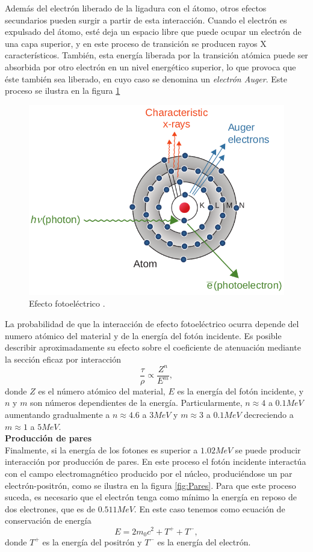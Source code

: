 Además del electrón liberado de la ligadura con el átomo, otros efectos secundarios pueden surgir a partir de esta interacción. Cuando el electrón es expulsado del átomo, esté deja un espacio libre que puede ocupar un electrón de una capa superior, y en este proceso de transición se producen rayos X característicos. También, esta energía liberada por la transición atómica puede ser absorbida por otro electrón en un nivel energético superior, lo que provoca que éste también sea liberado, en cuyo caso se denomina un \textit{electrón Auger}. Este proceso se ilustra en la figura \ref{fig:fotoelectrico}\\
\begin{figure}[H]
	\centering
	\includegraphics[width=0.7\linewidth]{images/fotoelectrico.png}
	\caption{Efecto fotoeléctrico \cite{khan2014the}.}
	\label{fig:fotoelectrico}
\end{figure}

La probabilidad de que la interacción de efecto fotoeléctrico ocurra depende del numero atómico del material y de la energía del fotón incidente. Es posible describir aproximadamente su efecto sobre el coeficiente de atenuación mediante la sección eficaz por interacción
\begin{equation}
	\frac{\tau}{\rho}\propto \frac{Z^n}{E^m},
\end{equation} 
donde $Z$ es el número atómico del material, $E$ es la energía del fotón incidente, y $n$ y $m$ son números dependientes de la energía. Particularmente, $n\approx 4$ a $0.1 MeV$ aumentando gradualmente a $n\approx4.6$ a $3 MeV$ y $m\approx3$ a $0.1 MeV$ decreciendo a $m\approx1$ a $5 MeV$\cite{Attix1986}.\\

\textbf{Producción de pares}\\

Finalmente, si la energía de los fotones es superior a $1.02 MeV$ se puede producir interacción por producción de pares. En este proceso el fotón incidente interactúa con el campo electromagnético producido por el núcleo, produciéndose un par electrón-positrón, como se ilustra en la figura \ref{fig:Pares}. Para que este proceso suceda, es necesario que el electrón tenga como mínimo la energía en reposo de dos electrones, que es de $0.511 MeV$. En este caso tenemos como ecuación de conservación de energía
\begin{equation}
	E=2m_0c^2+T^{+}+T^{-},
\end{equation}
donde $T^{+}$ es la energía del positrón y $T^{-}$ es la energía del electrón.\\

